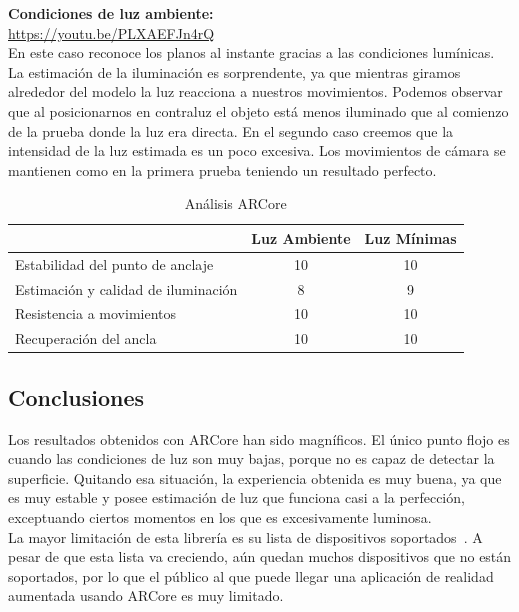 \textbf{Condiciones de luz ambiente:}\\
 \url{https://youtu.be/PLXAEFJn4rQ}\\

En este caso reconoce los planos al instante gracias a las condiciones lumínicas. La estimación de la iluminación es sorprendente, ya que mientras giramos alrededor del modelo la luz reacciona a nuestros movimientos. Podemos observar que al posicionarnos en contraluz el objeto está menos iluminado que al comienzo de la prueba donde la luz era directa. En el segundo caso creemos que la intensidad de la luz estimada es un poco excesiva. Los movimientos de cámara se mantienen como en la primera prueba teniendo un resultado perfecto.

\begin{table}[H]
    \centering
      \begin{tabular}{l c c}
    \toprule
          & Luz Ambiente & Luz Mínimas \\
         \midrule
        Estabilidad del punto de anclaje   &10 &10\\
        
        Estimación y calidad de iluminación  &8 &9 \\
        
        Resistencia a movimientos  &10 &10 \\
        
        Recuperación del ancla  &10 &10 \\
      \bottomrule
    \end{tabular}
    \caption{Análisis ARCore}
    \label{tab:TARCore}
\end{table}
\subsection{Conclusiones}
Los resultados obtenidos con ARCore han sido magníficos. El único punto flojo es cuando las condiciones de luz son muy bajas, porque no es capaz de detectar la superficie. Quitando esa situación, la experiencia obtenida es muy buena, ya que es muy estable y posee estimación de luz que funciona casi a la perfección, exceptuando ciertos momentos en los que es excesivamente luminosa.\\

La mayor limitación de esta librería es su lista de dispositivos soportados~\cite{ARCoreList}. A pesar de que esta lista va creciendo, aún quedan muchos dispositivos que no están soportados, por lo que el público al que puede llegar una aplicación de realidad aumentada usando ARCore es muy limitado.

